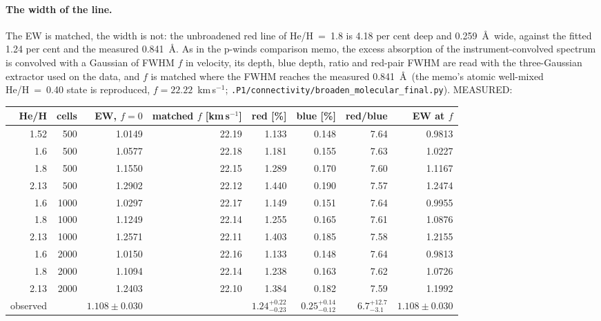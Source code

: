 \documentclass[11pt]{my_memo}
\begin{document}
\paragraph{The width of the line.} The EW is matched, the width is not: the
unbroadened red line of He/H~=~1.8 is 4.18 per cent deep and 0.259~\AA\
wide, against the fitted 1.24 per cent and the measured 0.841~\AA. As in the p-winds comparison memo, the excess absorption of
the instrument-convolved spectrum is convolved with a Gaussian of FWHM $f$
in velocity, its depth, blue depth, ratio and red-pair FWHM are read with
the three-Gaussian extractor used on the data, and $f$ is matched where the
FWHM reaches the measured 0.841~\AA\ (the memo's atomic well-mixed
He/H~=~0.40 state is reproduced, $f = 22.22$~km\,s$^{-1}$;
\texttt{.P1/connectivity/broaden\_molecular\_final.py}). MEASURED:

\begin{center}
\footnotesize
\begin{tabular}{@{}r r r r r r r r@{}}
\toprule
He/H & cells & EW, $f=0$ & matched $f$ [km\,s$^{-1}$] & red [\%] & blue [\%] & red/blue & EW at $f$\\
\midrule
1.52 & 500 & 1.0149 & 22.19 & 1.133 & 0.148 & 7.64 & 0.9813\\
1.6 & 500 & 1.0577 & 22.18 & 1.181 & 0.155 & 7.63 & 1.0227\\
1.8 & 500 & 1.1550 & 22.15 & 1.289 & 0.170 & 7.60 & 1.1167\\
2.13 & 500 & 1.2902 & 22.12 & 1.440 & 0.190 & 7.57 & 1.2474\\
1.6 & 1000 & 1.0297 & 22.17 & 1.149 & 0.151 & 7.64 & 0.9955\\
1.8 & 1000 & 1.1249 & 22.14 & 1.255 & 0.165 & 7.61 & 1.0876\\
2.13 & 1000 & 1.2571 & 22.11 & 1.403 & 0.185 & 7.58 & 1.2155\\
1.6 & 2000 & 1.0150 & 22.16 & 1.133 & 0.148 & 7.64 & 0.9813\\
1.8 & 2000 & 1.1094 & 22.14 & 1.238 & 0.163 & 7.62 & 1.0726\\
2.13 & 2000 & 1.2403 & 22.10 & 1.384 & 0.182 & 7.59 & 1.1992\\
\midrule
observed & & $1.108\pm0.030$ & & $1.24^{+0.22}_{-0.23}$ & $0.25^{+0.14}_{-0.12}$ & $6.7^{+12.7}_{-3.1}$ & $1.108\pm0.030$\\
\bottomrule
\end{tabular}
\end{center}
\end{document}
